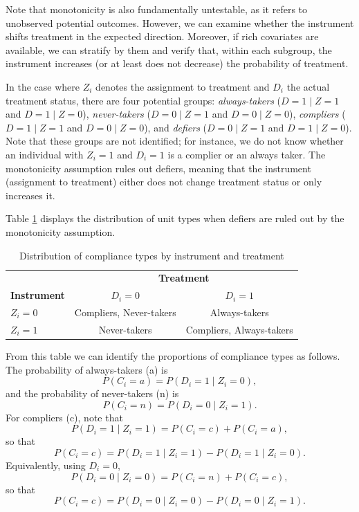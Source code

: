 Note that monotonicity is also fundamentally untestable, as it refers to unobserved potential outcomes. However, we can examine whether the instrument shifts treatment in the expected direction. Moreover, if rich covariates are available, we can stratify by them and verify that, within each subgroup, the instrument increases (or at least does not decrease) the probability of treatment.

In the case where $Z_i$ denotes the assignment to treatment and $D_i$ the actual treatment status, there are four potential groups: \textit{always-takers} ($D = 1 \mid Z = 1$ and $D = 1 \mid Z = 0$), \textit{never-takers} ($D = 0 \mid Z = 1$ and $D = 0 \mid Z = 0$), \textit{compliers} ($D = 1 \mid Z = 1$ and $D = 0 \mid Z = 0$), and \textit{defiers} ($D = 0 \mid Z = 1$ and $D = 1 \mid Z = 0$). Note that these groups are not identified; for instance, we do not know whether an individual with $Z_i = 1$ and $D_i = 1$ is a complier or an always taker. The monotonicity assumption rules out defiers, meaning that the instrument (assignment to treatment) either does not change treatment status or only increases it.

Table \ref{tab:2x2} displays the distribution of unit types when defiers are ruled out by the monotonicity assumption. 

\begin{table}[ht]
	\centering
	\caption{Distribution of compliance types by instrument and treatment}\label{tab:2x2}
	\begin{tabular}{lcc}
		\hline
		& \multicolumn{2}{c}{\textbf{Treatment}} \\ 
		\cline{2-3}
		\textbf{Instrument} & $D_i = 0$ & $D_i = 1$ \\ 
		\hline
		$Z_i=0$  & Compliers, Never-takers & Always-takers \\[0.25em]
		$Z_i=1$  & Never-takers & Compliers, Always-takers \\ 
		\hline
	\end{tabular}
\end{table}

From this table we can identify the proportions of compliance types as follows. The probability of always-takers (a) is
\[
P(C_i = a) = P(D_i=1 \mid Z_i=0),
\]
and the probability of never-takers (n) is
\[
P(C_i = n) = P(D_i=0 \mid Z_i=1).
\]
For compliers (c), note that
\[
P(D_i=1 \mid Z_i=1) = P(C_i=c) + P(C_i=a),
\]
so that
\[
P(C_i = c) = P(D_i=1 \mid Z_i=1) - P(D_i=1 \mid Z_i=0).
\]
Equivalently, using $D_i=0$,
\[
P(D_i=0 \mid Z_i=0) = P(C_i=n) + P(C_i=c),
\]
so that
\[
P(C_i = c) = P(D_i=0 \mid Z_i=0) - P(D_i=0 \mid Z_i=1).
\]

